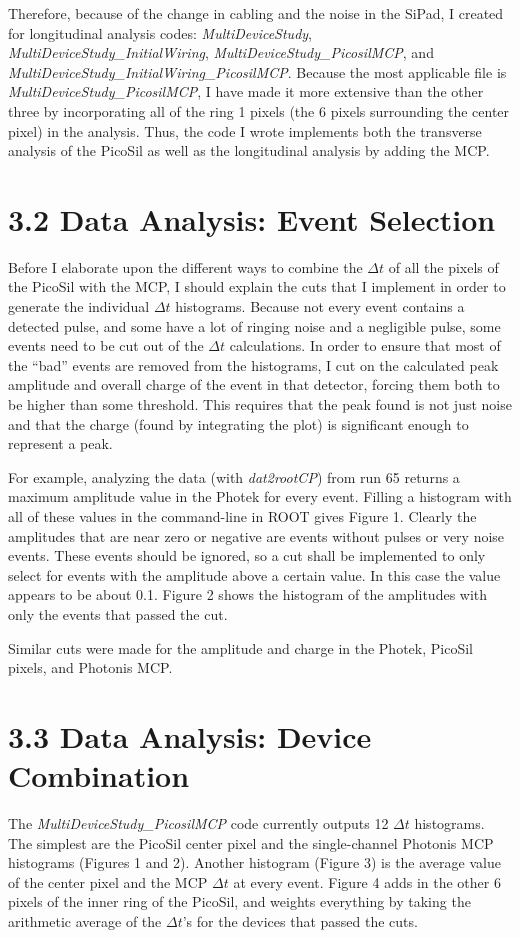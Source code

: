 \documentclass[12pt]{article}
\begin{document}
Therefore, because of the change in cabling and the noise in the SiPad, I created for longitudinal analysis codes: \textit{MultiDeviceStudy}, \textit{MultiDeviceStudy\_InitialWiring}, \textit{MultiDeviceStudy\_PicosilMCP}, and \textit{MultiDeviceStudy\_InitialWiring\_PicosilMCP}. 
Because the most applicable file is \textit{MultiDeviceStudy\_PicosilMCP}, I have made it more extensive than the other three by incorporating all of the ring 1 pixels (the 6 pixels surrounding the center pixel) in the analysis. 
Thus, the code I wrote implements both the transverse analysis of the PicoSil as well as the longitudinal analysis by adding the MCP.

\section*{3.2 Data Analysis: Event Selection}
Before I elaborate upon the different ways to combine the $\Delta t$ of all the pixels of the PicoSil with the MCP, I should explain the cuts that I implement in order to generate the individual $\Delta t$ histograms. 
Because not every event contains a detected pulse, and some have a lot of ringing noise and a negligible pulse, some events need to be cut out of the $\Delta t$ calculations. 
In order to ensure that most of the “bad” events are removed from the histograms, I cut on the calculated peak amplitude and overall charge of the event in that detector, forcing them both to be higher than some threshold. 
This requires that the peak found is not just noise and that the charge (found by integrating the plot) is significant enough to represent a peak.

For example, analyzing the data (with \textit{dat2rootCP}) from run 65 returns a maximum amplitude value in the Photek for every event. 
Filling a histogram with all of these values in the command-line in ROOT gives Figure 1. 
Clearly the amplitudes that are near zero or negative are events without pulses or very noise events. 
These events should be ignored, so a cut shall be implemented to only select for events with the amplitude above a certain value. 
In this case the value appears to be about 0.1. 
Figure 2 shows the histogram of the amplitudes with only the events that passed the cut.


Similar cuts were made for the amplitude and charge in the Photek, PicoSil pixels, and Photonis MCP. 

\section*{3.3 Data Analysis: Device Combination}
The \textit{MultiDeviceStudy\_PicosilMCP} code currently outputs 12 $\Delta t$ histograms. 
The simplest are the PicoSil center pixel and the single-channel Photonis MCP histograms (Figures 1 and 2). 
Another histogram (Figure 3) is the average value of the center pixel and the MCP $\Delta t$ at every event. 
Figure 4 adds in the other 6 pixels of the inner ring of the PicoSil, and weights everything by taking the arithmetic average of the $\Delta t$’s for the devices that passed the cuts.
\end{document}
